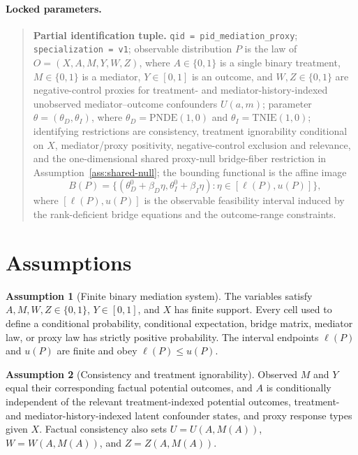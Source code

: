 \documentclass[11pt]{article}
\theoremstyle{definition}
\newtheorem{assumption}{Assumption}
\theoremstyle{plain}
\theoremstyle{remark}
\begin{document}
\paragraph{Locked parameters.}
\begin{quote}
\textbf{Partial identification tuple.}
\texttt{qid = pid\_mediation\_proxy};
\texttt{specialization = v1};
observable distribution \(P\) is the law of \(O=(X,A,M,Y,W,Z)\), where
\(A\in\{0,1\}\) is a single binary treatment, \(M\in\{0,1\}\) is a mediator,
\(Y\in[0,1]\) is an outcome, and \(W,Z\in\{0,1\}\) are negative-control
proxies for treatment- and mediator-history-indexed unobserved
mediator--outcome confounders \(U(a,m)\);
parameter \(\theta=(\theta_D,\theta_I)\), where
\(\theta_D=\mathrm{PNDE}(1,0)\) and \(\theta_I=\mathrm{TNIE}(1,0)\);
identifying restrictions are consistency, treatment ignorability conditional
on \(X\), mediator/proxy positivity, negative-control exclusion and relevance,
and the one-dimensional shared proxy-null bridge-fiber restriction in
Assumption~\ref{ass:shared-null};
the bounding functional is the affine image
\[
  B(P)=\{(\theta_D^0+\beta_D\eta,\theta_I^0+\beta_I\eta):
       \eta\in[\ell(P),u(P)]\},
\]
where \([\ell(P),u(P)]\) is the observable feasibility interval induced by
the rank-deficient bridge equations and the outcome-range constraints.
\end{quote}

\section{Assumptions}
\begin{assumption}[Finite binary mediation system]\label{ass:finite}
The variables satisfy \(A,M,W,Z\in\{0,1\}\), \(Y\in[0,1]\), and \(X\) has finite
support.  Every cell used to define a conditional probability, conditional
expectation, bridge matrix, mediator law, or proxy law has strictly positive
probability.  The interval endpoints \(\ell(P)\) and \(u(P)\) are finite and
obey \(\ell(P)\le u(P)\).
\end{assumption}

\begin{assumption}[Consistency and treatment ignorability]\label{ass:consistency}
Observed \(M\) and \(Y\) equal their corresponding factual potential outcomes,
and \(A\) is conditionally independent of the relevant treatment-indexed
potential outcomes, treatment- and mediator-history-indexed latent confounder
states, and proxy response types given \(X\).  Factual consistency also sets
\(U=U(A,M(A))\), \(W=W(A,M(A))\), and \(Z=Z(A,M(A))\).
\end{assumption}
\end{document}
